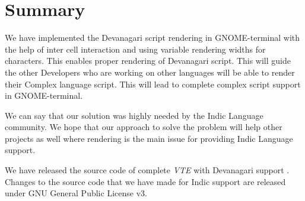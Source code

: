 %

\chapter{Summary}

We have implemented the Devanagari script rendering in GNOME-terminal with the help of inter cell interaction and using variable rendering widths for characters. This enables proper rendering of Devanagari script. This will guide the other Developers who are working on other languages will be able to render their Complex language script. This will lead to complete complex script support in GNOME-terminal.

We can say that our solution was highly needed by the Indic Language community. We hope that our approach to solve the problem will help other projects as well where rendering is the main issue for providing Indic Language support.

We have released the source code of complete \textit{VTE} with Devanagari support \cite{sourcecode}. Changes to the source code that we have made for Indic support are released under GNU General Public License v3.


